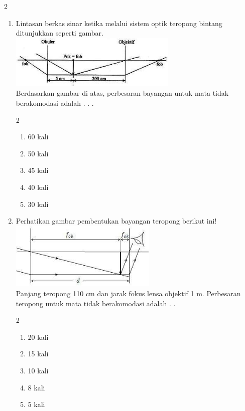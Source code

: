 \documentclass[10pt,a4paper]{extarticle}
\newcommand{\pilgani}[1]{                            \vspace{-0.3cm}\begin{multicols}{2}
 \begin{enumerate}[label=\Alph*., itemsep=0pt,topsep=0pt,leftmargin=*,align=Center]#1                     \end{enumerate}
 \phantom{ini cuma sapi, wedus, dan ayam}
 \end{multicols}}
\begin{document}
\begin{multicols*}{2}
\begin{enumerate}
\item Lintasan berkas sinar ketika melalui sistem optik teropong bintang ditunjukkan seperti gambar. \\
\includegraphics[width=8cm]{pic/teropong-bintang} \\
Berdasarkan gambar di atas, perbesaran bayangan untuk mata tidak berakomodasi adalah . . .
\pilgani{
	\item 60 kali
	\item 50 kali
	\item 45 kali
	\item 40 kali
	\item 30 kali
}
\vspace{3cm}
\item Perhatikan gambar pembentukan bayangan teropong berikut ini!\\
\includegraphics[width=7cm]{pic/bayangan-teropong}\\
Panjang teropong 110 cm dan jarak fokus lensa objektif 1 m. Perbesaran teropong untuk mata tidak berakomodasi adalah . . 
\pilgani{
	\item 20 kali
	\item 15 kali
	\item 10 kali
	\item 8 kali
	\item 5 kali }
\vspace{3cm}



\end{enumerate}
\end{multicols*}
\end{document}
